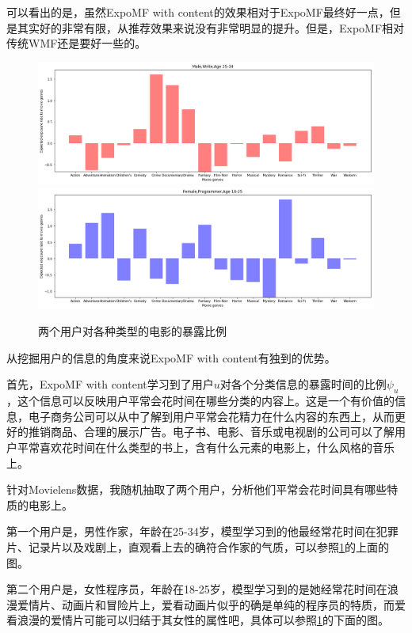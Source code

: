 \documentclass[notitlepage,cs4size,punct,oneside]{ctexrep}
\numberwithin{equation}{chapter}
\theoremstyle{mystyle}
\begin{document}
\par
可以看出的是，虽然ExpoMF with content的效果相对于ExpoMF最终好一点，但是其实好的非常有限，从推荐效果来说没有非常明显的提升。但是，ExpoMF相对传统WMF还是要好一些的。

\begin{figure}[h]
 \includegraphics[width=\textwidth]{./results/writer.png}
 \includegraphics[width=\textwidth]{./results/programmer.png}
 \caption{两个用户对各种类型的电影的暴露比例}
 \label{figure:ExposureRate}
\end{figure}
\par
从挖掘用户的信息的角度来说ExpoMF with content有独到的优势。
\par
首先，ExpoMF with content学习到了用户$u$对各个分类信息的暴露时间的比例$\psi_u$，这个信息可以反映用户平常会花时间在哪些分类的内容上。这是一个有价值的信息，电子商务公司可以从中了解到用户平常会花精力在什么内容的东西上，从而更好的推销商品、合理的展示广告。电子书、电影、音乐或电视剧的公司可以了解用户平常喜欢花时间在什么类型的书上，含有什么元素的电影上，什么风格的音乐上。
\par
针对Movielens数据，我随机抽取了两个用户，分析他们平常会花时间具有哪些特质的电影上。
\par
第一个用户是，男性作家，年龄在25-34岁，模型学习到的他最经常花时间在犯罪片、记录片以及戏剧上，直观看上去的确符合作家的气质，可以参照\ref{figure:ExposureRate}的上面的图。
\par
第二个用户是，女性程序员，年龄在18-25岁，模型学习到的是她经常花时间在浪漫爱情片、动画片和冒险片上，爱看动画片似乎的确是单纯的程序员的特质，而爱看浪漫的爱情片可能可以归结于其女性的属性吧，具体可以参照\ref{figure:ExposureRate}的下面的图。
\end{document}
